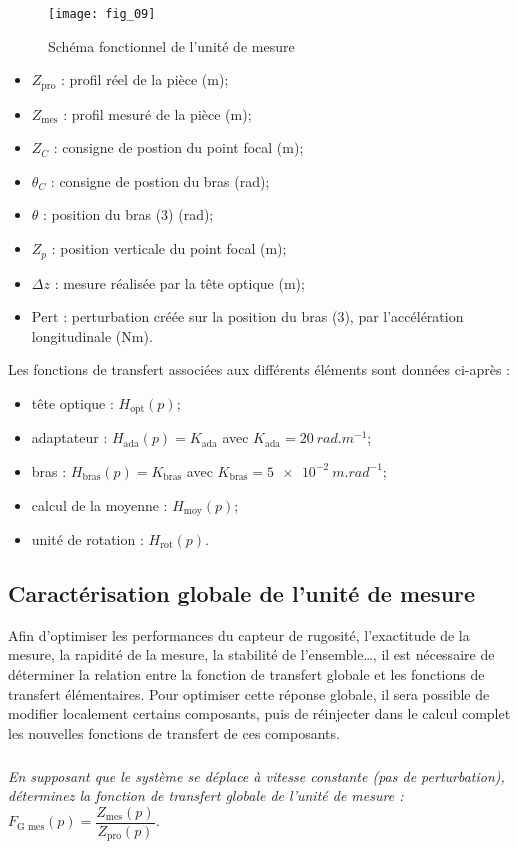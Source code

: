 \begin{figure}[H]
\centering
\texttt{[image: fig\_09]}
\caption{\label{fig_09} Schéma fonctionnel de l’unité de mesure}
\end{figure}

\begin{multicols}{2}
\begin{itemize}
\item $Z_{\text{pro}}$ : profil réel de la pièce (m);
\item $Z_{\text{mes}}$ : profil mesuré de la pièce (m);
\item $Z_{C}$ : consigne de postion du point focal (m);
\item $\theta_{C}$ : consigne de postion du bras (\si{rad});
\item $\theta$ : position du bras (3) (\si{rad});
\item $Z_{p}$ : position verticale du point focal (m);
\item $\Delta z$ : mesure réalisée par la tête optique (m);
\item $\text{Pert}$ : perturbation créée sur la position du bras (3), par l'accélération longitudinale (\si{Nm}).
\end{itemize}
\end{multicols}

Les fonctions de transfert associées aux différents éléments sont données ci-après : 
\begin{itemize}
\item tête optique : $H_{\text{opt}}(p)$;
\item adaptateur : $H_{\text{ada}}(p)=K_{\text{ada}}$ avec $K_{\text{ada}}=\SI{20}{rad.m^{-1}}$;
\item bras : $H_{\text{bras}}(p)=K_{\text{bras}}$ avec $K_{\text{bras}}=\SI{5e-2}{m.rad^{-1}}$;
\item calcul de la moyenne : $H_{\text{moy}}(p)$;
\item unité de rotation : $H_{\text{rot}}(p)$.
\end{itemize}




\subsection{Caractérisation globale de l'unité de mesure}

Afin d’optimiser les performances du capteur de rugosité, l’exactitude de la mesure, la rapidité de la
mesure, la stabilité de l’ensemble…, il est nécessaire de déterminer la relation entre la fonction de transfert
globale et les fonctions de transfert élémentaires. Pour optimiser cette réponse globale, il sera possible de
modifier localement certains composants, puis de réinjecter dans le calcul complet les nouvelles fonctions
de transfert de ces composants.
\subparagraph{\label{q_08}}\textit{ En supposant que le système se déplace à vitesse constante (pas de perturbation), déterminez la fonction de transfert globale de l’unité de mesure : $F_{\text{G mes}}(p)=\dfrac{Z_{\text{mes}}(p)}{Z_{\text{pro}}(p)}$.}


